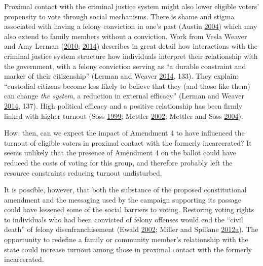 \documentclass[
  12pt,
]{article}
\begin{document}
Proximal contact with the criminal justice system might also lower eligible voters' propensity to vote through social mechanisms. There is shame and stigma associated with having a felony conviction in one's past (Austin \protect\hyperlink{ref-Austin2004}{2004}) which may also extend to family members without a conviction. Work from Vesla Weaver and Amy Lerman (\protect\hyperlink{ref-Weaver2010}{2010}; \protect\hyperlink{ref-Lerman2014}{2014}) describes in great detail how interactions with the criminal justice system structure how individuals interpret their relationship with the government, with a felony conviction serving as ``a durable constraint and marker of their citizenship'' (Lerman and Weaver \protect\hyperlink{ref-Lerman2014}{2014}, 133). They explain: ``custodial citizens become less likely to believe that they (and those like them) can change \emph{the system}, a reduction in external efficacy'' (Lerman and Weaver \protect\hyperlink{ref-Lerman2014}{2014}, 137). High political efficacy and a positive relationship has been firmly linked with higher turnout (Soss \protect\hyperlink{ref-Soss1999}{1999}; Mettler \protect\hyperlink{ref-Mettler2002}{2002}; Mettler and Soss \protect\hyperlink{ref-Mettler2004}{2004}).

How, then, can we expect the impact of Amendment 4 to have influenced the turnout of eligible voters in proximal contact with the formerly incarcerated? It seems unlikely that the presence of Amendment 4 on the ballot could have reduced the costs of voting for this group, and therefore probably left the resource constraints reducing turnout undisturbed.

It is possible, however, that both the substance of the proposed constitutional amendment and the messaging used by the campaign supporting its passage could have lessened some of the social barriers to voting. Restoring voting rights to individuals who had been convicted of felony offenses would end the ``civil death'' of felony disenfranchisement (Ewald \protect\hyperlink{ref-Ewald2002}{2002}; Miller and Spillane \protect\hyperlink{ref-Miller2012}{2012}\protect\hyperlink{ref-Miller2012}{a}). The opportunity to redefine a family or community member's relationship with the state could increase turnout among those in proximal contact with the formerly incarcerated.
\end{document}
